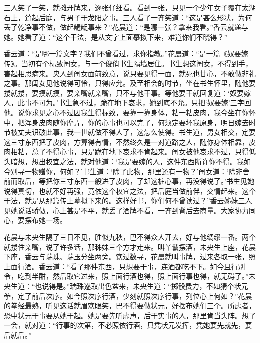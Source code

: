 \documentclass[a4paper,12pt,UTF8,twoside]{ctexbook}
\begin{document}
三人笑了一笑，就摊开牌来，逐张仔细看。看到一张，只见一个少年女子覆在太湖石上，耸起后庭，与男子干龙阳之事。三人看了一齐笑道：“这是甚么形状，为何丢了乾净事不做，做起龌龊事来？”花晨道：“是哪一张？拿来我看。”香云就递与她。她看了道：“这个干法，是从文字上面摹拟下来，难道你们不晓得？”

香云道：“是哪一篇文字？我们不曾看过，求你指教。”花晨道：“是一篇《奴要嫁传》。当初有个标致闺女，与一个俊俏书生隔墙居住。书生想这闺女，不得到手，害起相思病来。央人到闺女面前致意，说只要见得一面，就死也甘心，不敢做非礼之事。那闺女见他说得可怜，只得应允。及至相会的时节，坐在书生怀里，随他要搂就搂，要摸就摸，要亲嘴就亲嘴，只不与他干事。等他要干就回复道：‘奴要嫁人，此事不可为。’书生急不过，跪在地下哀求，她到底不允。只把‘奴要嫁’三字回他。说你求见之心不过因我生得标致，要靠一靠身体，粘一粘皮肉，我今坐在你怀中，把浑身皮肉随你摩弄，你的心事也可以完了，何须定要坏我原身，明日嫁去时节被丈夫识破此事，我一世就做不得人了，这怎么使得。书生道，男女相交，定要这三寸东西把了皮肉，方算得有情，不然终久是一对道路之人，随你身体相靠，皮肉相粘，总了不得心事，只是跪在地下哀求不肯起来。闺女被他哀求不过，只得低头暗想，想出权宜之法，就对他道：‘我是要嫁的人，这件东西断许你不得。我如今别寻一物赠你，何如？’书生道：‘除了此物，那里还有一物？’闺女道：‘除非舍前而取后，等把你三寸东西一般进了皮肉，了却这桩心事，再没得说了。’书生见她说得真切，也就不好再强，竟依这个权宜之法，把后庭当做前伴，交情起来。这个干法，就是从那篇传上摹拟下来的。这样好书，你们何不曾读过？”香云姊妹三人见她说话骄傲，心上甚是不平，就丢了酒牌不看，一齐到背后去商量。大家协力同心，要摆布她一场。

花晨与未央生隔了三日不见，胜似九秋，巴不得众人开去，好与他绸缪一番。两个就搂住亲嘴，说了许多话，那秭妹三个方才走来。叫丫鬟摆酒，未央生上座，花晨下座，香云与瑞珠、瑞玉分坐两旁。饮过数寻，花晨就叫事牌，过来各取一张，照上面行酒。香云道：“看了那件东西，只想要干事，连酒都吃不下。如今且行别令，吃到半酣，然后取它过来，照上面行酒也得，照上面行事也得，就无碍了。”未央生道：“也说得是。”瑞珠遂取出色盆来，未央生道：“掷骰费力，不如猜个状元拳，定了前后次序。如今照次序行酒，少刻就照次序行事，列位心上何如？”花晨的拳经最熟，听见这话就眉欢眼笑，巴不得要做状元，好摆布她们三个。所虑者，恐中状元干事要从她干起。她是要先听虚声，后干实事的人，那里肯当头阵。想了一会，就对道：“行事的次第，不必照依行酒，只凭状元发挥，凭她要先就先，要后就后。”
\end{document}
